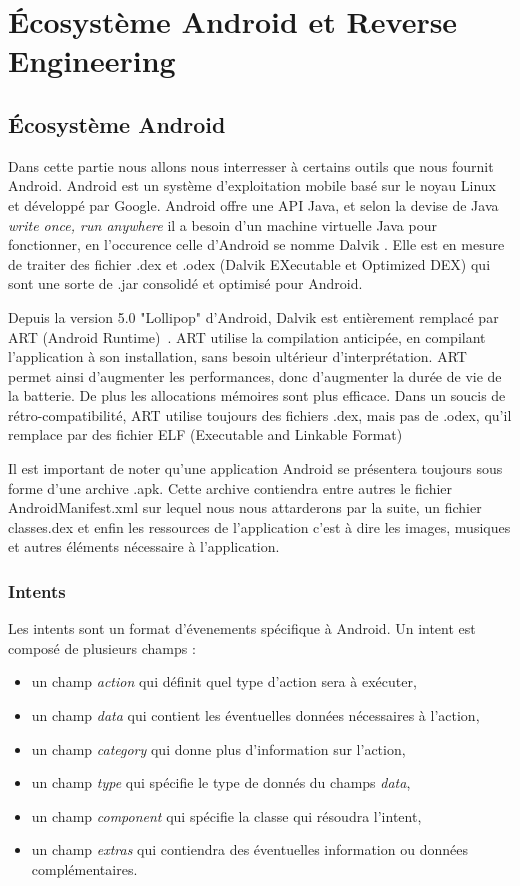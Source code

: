 \documentclass[12pt]{article}
\begin{document}
\section{Écosystème Android et Reverse Engineering}

\subsection{Écosystème Android}
Dans cette partie nous allons nous interresser à certains outils que nous fournit Android.
Android est un système d'exploitation mobile basé sur le noyau Linux et développé par Google.
Android offre une API Java, et selon la devise de Java \textit{\og write once, run anywhere\fg{}} il a besoin d'un machine virtuelle Java pour fonctionner, en l'occurence celle d'Android se  nomme \og Dalvik \fg{}. Elle est en mesure de traiter des fichier .dex et .odex (Dalvik EXecutable et Optimized DEX) qui sont une sorte de .jar consolidé et optimisé pour Android.

Depuis la version 5.0 "Lollipop" d'Android, Dalvik est entièrement remplacé par ART (Android Runtime)~\cite{ART}. ART utilise la compilation anticipée, en compilant l'application à son installation, sans besoin ultérieur d'interprétation. ART permet ainsi d'augmenter les performances, donc d'augmenter la durée de vie de la batterie. De plus les allocations mémoires sont plus efficace. Dans un soucis de rétro-compatibilité, ART utilise toujours des fichiers .dex, mais pas de .odex, qu'il remplace par des fichier ELF (Executable and Linkable Format)

Il est important de noter qu'une application Android se présentera toujours sous forme d'une archive .apk. Cette archive contiendra entre autres le fichier AndroidManifest.xml sur lequel nous nous attarderons par la suite, un fichier classes.dex et enfin les ressources de l'application c'est à dire les images, musiques et autres éléments nécessaire à l'application.

\subsubsection{Intents}
Les intents sont un format d'évenements spécifique à Android. Un intent est composé de plusieurs champs : 
\begin{itemize}
\item un champ \textit{action} qui définit quel type d'action sera à exécuter,
\item un champ \textit{data} qui contient les éventuelles données nécessaires à l'action,
\item un champ \textit{category} qui donne plus d'information sur l'action,
\item un champ \textit{type} qui spécifie le type de donnés du champs \textit{data},
\item un champ \textit{component} qui spécifie la classe qui résoudra l'intent,
\item un champ \textit{extras} qui contiendra des éventuelles information ou données complémentaires.
\end{itemize}
\end{document}
